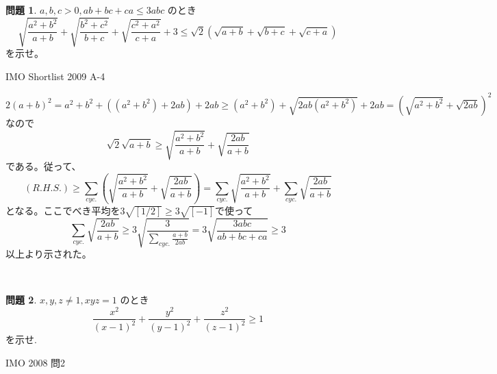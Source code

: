 \documentclass[uplatex, a5paper]{jsarticle}
\makeatletter
\theoremstyle{definition}
\newtheorem{prob}{問題}
\renewenvironment{proof}[1][\proofname]{
  \pushQED{\qed}%
  \normalfont \topsep6\p@\@plus6\p@\relax
  \trivlist
  \item[\hskip\labelsep
    #1\@addpunct{\textbf{.}}]\ignorespaces
}{%
  \popQED\endtrivlist\@endpefalse
}
\providecommand{\proofname}{証明}
\def\qed{\hfill $\Box$}
\makeatother
\begin{document}
\newpage

\begin{prob}
  \(a,b,c>0,ab+bc+ca\leq 3abc\)
  のとき
  \[
  \sqrt{\frac{a^2+b^2}{a+b}} +\sqrt{\frac{b^2+c^2}{b+c}} +\sqrt{\frac{c^2+a^2}{c+a}}+3
  \leq \sqrt{2} \left( \sqrt{a+b} +\sqrt{b+c} +\sqrt{c+a} \right)
  \]
  を示せ。
  \begin{flushright}
    IMO Shortlist 2009 A-4
  \end{flushright}
\end{prob}



\begin{proof}
  \[2(a+b)^2 = a^2+b^2 + \left( ( a^2 +b^2) + 2ab \right) + 2ab \geq ( a^2 + b^2) +\sqrt{2ab( a^2+b^2 )} + 2ab = \left( \sqrt{ a^2+b^2} + \sqrt{2ab} \right) ^2\]
  なので
  \[
  \sqrt{2}\sqrt{a+b} \geq \sqrt{ \frac{a^2+b^2}{a+b}} + \sqrt{ \frac{ 2ab}{a+b} }
  \]
  である。従って、
  \[
  ( R.H.S.)
  \geq \sum_{cyc.}\left( \sqrt{ \frac{a^2+b^2}{a+b}} + \sqrt{ \frac{ 2ab}{a+b} } \right)
  = \sum_{cyc.} \sqrt{ \frac{a^2+b^2}{a+b}} + \sum_{cyc. } \sqrt{ \frac{ 2ab}{a+b} }
  \]
  となる。ここでべき平均を\(3\sqrt{[1/2]}\geq 3\sqrt{[-1]}\)で使って
  \[
  \sum_{cyc. } \sqrt{ \frac{ 2ab}{a+b} }
  \geq 3\sqrt{ \frac{3}{\sum_{cyc.}\frac{ a+b}{2ab}}} = 3\sqrt{ \frac{3abc}{ab+bc+ca} }
  \geq 3
  \]
  以上より示された。
\end{proof}






\




\newpage

\begin{prob}
  \(x,y,z\neq 1, xyz=1\)
  のとき
  \[
  \frac{x^2}{(x-1)^2} + \frac{y^2}{(y-1)^2} + \frac{z^2}{(z-1)^2} \geq 1
  \]
  を示せ.

  \begin{flushright}
    IMO 2008 問2
  \end{flushright}
\end{prob}
\end{document}
